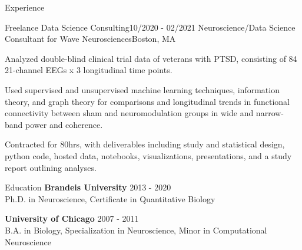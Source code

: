 \documentclass{resume} %
\begin{document}
\begin{rSection}{Experience}
\begin{rSubsection}{Freelance Data Science Consulting}{10/2020 - 02/2021}
{Neuroscience/Data Science Consultant for Wave Neurosciences}{Boston, MA}
\item Analyzed double-blind clinical trial data of veterans with PTSD, consisting of 84 21-channel EEGs x 3 longitudinal time points.

\item Used supervised and unsupervised machine learning techniques, information theory, and graph theory for comparisons and longitudinal trends in functional connectivity between sham and neuromodulation groups in wide and narrow-band power and coherence.

\item Contracted for 80hrs, with deliverables including study and statistical design, python code, hosted data, notebooks, visualizations, presentations, and a study report outlining analyses.
\end{rSubsection}

\end{rSection}


\begin{rSection}{Education}
{\bf Brandeis University} \hfill {2013 - 2020} \\
Ph.D. in Neuroscience, Certificate in Quantitative Biology

{\bf University of Chicago} \hfill {2007 - 2011} \\
B.A. in Biology, Specialization in Neuroscience, Minor in Computational Neuroscience

\end{rSection}
\end{document}
